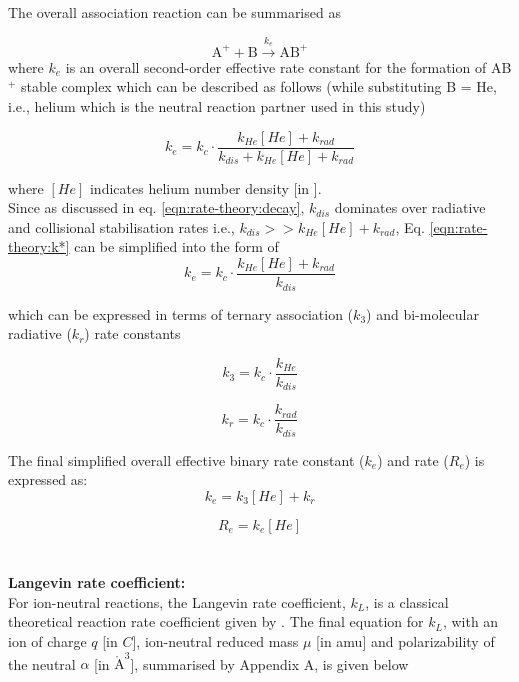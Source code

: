The overall association reaction can be summarised as 

\[ \text{A}^+ + \text{B} \xrightarrow{k_{e}} \text{AB}^+ \]
where $k_{e}$ is an overall second-order effective rate constant for the formation of AB$^+$ stable complex which can be described as follows (while substituting B = He, i.e., helium which is the neutral reaction partner used in this study)

\begin{equation}
    k_{e} = k_c \cdot \frac{k_{He}[He] + k_{rad}}{k_{dis} + k_{He}[He] + k_{rad}} 
    \label{eqn:rate-theory:k*}
\end{equation}

where $[He]$ indicates helium number density [in \percc].\\

Since as discussed in eq. \ref{eqn:rate-theory:decay}, $k_{dis}$ dominates over radiative and collisional stabilisation rates i.e., $k_{dis} >> k_{He}[He] + k_{rad}$, Eq. \ref{eqn:rate-theory:k*} can be simplified into the form of 
\[ k_{e} = k_c \cdot \frac{k_{He}[He] + k_{rad}}{k_{dis}} \]

which can be expressed in terms of ternary association ($k_3$) and bi-molecular radiative ($k_r$) rate constants 

\begin{equation}
    k_3 = k_c \cdot \frac{k_{He}}{k_{dis}}
    \label{eqn:rate-theory:k3}
\end{equation}

\begin{equation}
    k_r = k_c \cdot \frac{k_{rad}}{k_{dis}}
    \label{eqn:rate-theory:kr}
\end{equation}

The final simplified overall effective binary rate constant ($k_{e}$) and rate ($R_{e}$) is expressed as:
\begin{equation}
    k_{e} = k_3[He] + k_r
    \label{eqn:rate-theory:k*-simplified}
\end{equation}

\begin{equation}
    R_{e} = k_{e}[He]
    \label{eqn:rate-theory:R*-simplified}
\end{equation}
\\\\
\textbf{Langevin rate coefficient:}\\
For ion-neutral reactions, the Langevin rate coefficient, $k_L$, is a classical theoretical reaction rate coefficient given by \citet{langevin_notitle_1905}.  The final equation for $k_L$, with an ion of charge $q$ [in $C$], ion-neutral reduced mass $\mu$ [in amu] and polarizability of the neutral $\alpha$ [in $\mathring{\text{A}}^3$], summarised by \citet{asvany_numerical_2009} Appendix A, is given below
\label{discussions:Langevin}

